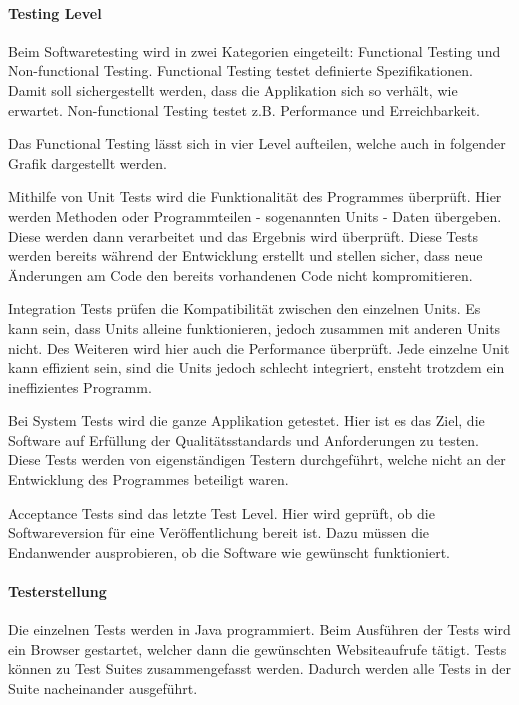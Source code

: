 \paragraph{Testing Level}
Beim Softwaretesting wird in zwei Kategorien eingeteilt: Functional Testing und Non-functional Testing. Functional Testing testet definierte Spezifikationen. Damit soll sichergestellt werden, dass die Applikation sich so verhält, wie erwartet. Non-functional Testing testet z.B. Performance und Erreichbarkeit.\cite{TESTING1}

Das Functional Testing lässt sich in vier Level aufteilen, welche auch in folgender Grafik dargestellt werden.


Mithilfe von Unit Tests wird die Funktionalität des Programmes überprüft. Hier werden Methoden oder Programmteilen - sogenannten Units - Daten übergeben. Diese werden dann verarbeitet und das Ergebnis wird überprüft. Diese Tests werden bereits während der Entwicklung erstellt und stellen sicher, dass neue Änderungen am Code den bereits vorhandenen Code nicht kompromitieren. \cite{TESTING3}

\newpage

Integration Tests prüfen die Kompatibilität zwischen den einzelnen Units. Es kann sein, dass Units alleine funktionieren, jedoch zusammen mit anderen Units nicht. Des Weiteren wird hier auch die Performance überprüft. Jede einzelne Unit kann effizient sein, sind die Units jedoch schlecht integriert, ensteht trotzdem ein ineffizientes Programm. \cite{TESTING3}

Bei System Tests wird die ganze Applikation getestet. Hier ist es das Ziel, die Software auf  Erfüllung der Qualitätsstandards und Anforderungen zu testen. Diese Tests werden von eigenständigen Testern durchgeführt, welche nicht an der Entwicklung des Programmes beteiligt waren. \cite{TESTING3}

Acceptance Tests sind das letzte Test Level. Hier wird geprüft, ob die Softwareversion für eine Veröffentlichung bereit ist. Dazu müssen die Endanwender ausprobieren, ob die Software wie gewünscht funktioniert. \cite{TESTING3}

\paragraph{Testerstellung}
Die einzelnen Tests werden in Java programmiert. Beim Ausführen der Tests wird ein Browser gestartet, welcher dann die gewünschten Websiteaufrufe tätigt. Tests können zu Test Suites zusammengefasst werden. Dadurch werden alle Tests in der Suite nacheinander ausgeführt. 

